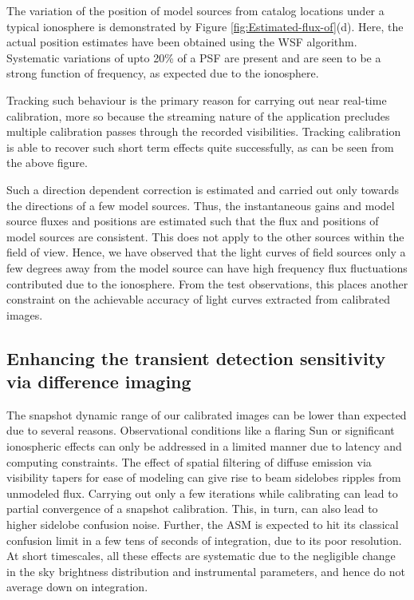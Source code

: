 \documentclass{aa}
\begin{document}
The variation  of the position of  model sources from catalog  locations under a
typical  ionosphere is  demonstrated  by Figure  \ref{fig:Estimated-flux-of}(d).
Here,  the  actual   position  estimates  have  been  obtained   using  the  WSF
algorithm. Systematic variations of upto 20\%  of a PSF are present and are seen
to be a strong function of frequency, as expected due to the ionosphere.




Tracking such  behaviour is the primary  reason for carrying  out near real-time
calibration, more so  because the streaming nature of  the application precludes
multiple  calibration   passes  through  the   recorded  visibilities.  Tracking
calibration is  able to recover such  short term effects  quite successfully, as
can be seen from the above figure.

Such a direction dependent correction  is estimated and carried out only towards
the directions of  a few model sources. Thus, the  instantaneous gains and model
source fluxes  and positions are estimated  such that the flux  and positions of
model sources  are consistent. This does  not apply to the  other sources within
the  field of  view. Hence,  we have  observed that  the light  curves  of field
sources only  a few degrees away from  the model source can  have high frequency
flux fluctuations contributed due to the ionosphere. From the test observations,
this  places another  constraint  on  the achievable  accuracy  of light  curves
extracted from calibrated images.


\subsection{\label{sub:Enhancing-the-transient}Enhancing the transient detection
sensitivity via difference imaging} The snapshot dynamic range of our calibrated
images  can  be lower  than  expected  due  to several  reasons.   Observational
conditions like  a flaring  Sun or significant  ionospheric effects can  only be
addressed  in a limited  manner due  to latency  and computing  constraints. The
effect of spatial  filtering of diffuse emission via  visibility tapers for ease
of  modeling  can give  rise  to beam  sidelobes  ripples  from unmodeled  flux.
Carrying  out  only a  few  iterations while  calibrating  can  lead to  partial
convergence of  a snapshot calibration. This,  in turn, can also  lead to higher
sidelobe  confusion noise. Further,  the ASM  is expected  to hit  its classical
confusion  limit in  a  few  tens of  seconds  of integration,  due  to its  poor
resolution. At  short timescales,  all these effects  are systematic due  to the
negligible  change   in  the   sky  brightness  distribution   and  instrumental
parameters, and hence do not average down on integration.
\end{document}
